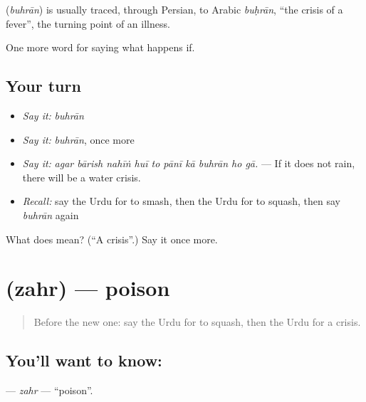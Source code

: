\begin{cousinweb}
\textbf{} (\emph{buhrān}) is usually traced, through Persian, to Arabic \emph{buḥrān}, \textquotedblleft{}the crisis of a fever\textquotedblright{}, the turning point of an illness.
\end{cousinweb}

\begin{grammarlens}[title={What you've built}]
One more word for saying what happens if.
\end{grammarlens}

\subsection*{Your turn}
\begin{itemize}
\raggedright
  \item \emph{Say it:} \emph{buhrān}
  \item \emph{Say it:} \emph{buhrān}, once more
  \item \emph{Say it:} \emph{agar bārish nahīṅ huī to pānī kā buhrān ho gā.} — If it does not rain, there will be a water crisis.
  \item \emph{Recall:} say the Urdu for to smash, then the Urdu for to squash, then say \emph{buhrān} again
\end{itemize}

\begin{tcolorbox}[breakable,colback=teal!4,colframe=teal!35!black,title={Before you move on}]
What does  mean? (\textquotedblleft{}A crisis\textquotedblright{}.) Say it once more.
\end{tcolorbox}
\section[\texorpdfstring{\ur{زہر} (zahr)}{زہر (zahr)}]{ (zahr) — poison}

\label{lesson:UR-C371-zahr}



\begin{quote}
Before the new one: say the Urdu for to squash, then the Urdu for a crisis.
\end{quote}

\subsection*{You'll want to know: }
\textbf{} — \emph{zahr} — \textquotedblleft{}poison\textquotedblright{}.

